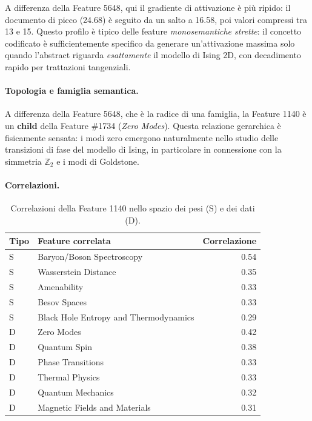 A differenza della Feature 5648, qui il gradiente di attivazione è più ripido: il documento di picco (24.68) è seguito da un salto a 16.58, poi valori compressi tra 13 e 15. Questo profilo è tipico delle feature \textit{monosemantiche strette}: il concetto codificato è sufficientemente specifico da generare un'attivazione massima solo quando l'abstract riguarda \textit{esattamente} il modello di Ising 2D, con decadimento rapido per trattazioni tangenziali.

\paragraph{Topologia e famiglia semantica.}
A differenza della Feature 5648, che è la radice di una famiglia, la Feature 1140 è un \textbf{child} della Feature \#1734 (\textit{Zero Modes}). Questa relazione gerarchica è fisicamente sensata: i modi zero emergono naturalmente nello studio delle transizioni di fase del modello di Ising, in particolare in connessione con la simmetria $\mathbb{Z}_2$ e i modi di Goldstone.

\paragraph{Correlazioni.}
\begin{table}[htbp]
    \centering
    \caption{Correlazioni della Feature 1140 nello spazio dei pesi (S) e dei dati (D).}
    \label{tab:feature_1140_corr}
    \begin{tabular}{@{}llr@{}}
        \toprule
        \textbf{Tipo} & \textbf{Feature correlata} & \textbf{Correlazione} \\
        \midrule
        S & Baryon/Boson Spectroscopy & 0.54 \\
        S & Wasserstein Distance & 0.35 \\
        S & Amenability & 0.33 \\
        S & Besov Spaces & 0.33 \\
        S & Black Hole Entropy and Thermodynamics & 0.29 \\
        \midrule
        D & Zero Modes & 0.42 \\
        D & Quantum Spin & 0.38 \\
        D & Phase Transitions & 0.33 \\
        D & Thermal Physics & 0.33 \\
        D & Quantum Mechanics & 0.32 \\
        D & Magnetic Fields and Materials & 0.31 \\
        \bottomrule
    \end{tabular}
\end{table}

